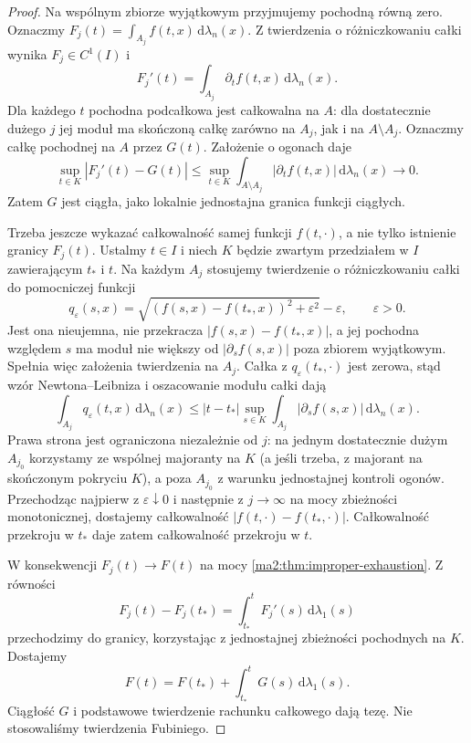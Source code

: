 \begin{proof}
Na wspólnym zbiorze wyjątkowym przyjmujemy
pochodną równą zero. Oznaczmy
$F_j(t)=\int_{A_j}f(t,x)\,\mathrm d\lambda_n(x)$.
Z twierdzenia o różniczkowaniu całki
wynika $F_j\in C^1(I)$ i
\[
 F_j'(t)=\int_{A_j}\partial_t f(t,x)\,
                         \mathrm d\lambda_n(x).
\]
Dla każdego $t$ pochodna podcałkowa jest
całkowalna na $A$: dla dostatecznie dużego
$j$ jej moduł ma skończoną całkę zarówno
na $A_j$, jak i na $A\setminus A_j$.
Oznaczmy całkę pochodnej na $A$ przez $G(t)$.
Założenie o ogonach daje
\[
 \sup_{t\in K}|F_j'(t)-G(t)|
 \le\sup_{t\in K}\int_{A\setminus A_j}
 |\partial_t f(t,x)|\,\mathrm d\lambda_n(x)
 \longrightarrow0.
\]
Zatem $G$ jest ciągła, jako lokalnie
jednostajna granica funkcji ciągłych.

Trzeba jeszcze wykazać całkowalność
samej funkcji $f(t,\cdot)$, a nie tylko
istnienie granicy $F_j(t)$.
Ustalmy $t\in I$ i niech $K$ będzie
zwartym przedziałem w $I$ zawierającym
$t_*$ i $t$. Na każdym $A_j$ stosujemy
twierdzenie o różniczkowaniu całki
do pomocniczej funkcji
\[
 q_\varepsilon(s,x)=
 \sqrt{(f(s,x)-f(t_*,x))^2+\varepsilon^2}
 -\varepsilon,\qquad \varepsilon>0.
\]
Jest ona nieujemna, nie przekracza
$|f(s,x)-f(t_*,x)|$, a jej pochodna
względem $s$ ma moduł nie większy od
$|\partial_s f(s,x)|$ poza zbiorem
wyjątkowym. Spełnia więc założenia
twierdzenia na $A_j$.
Całka z $q_\varepsilon(t_*,\cdot)$
jest zerowa, stąd wzór Newtona--Leibniza
i oszacowanie modułu całki dają
\[
 \int_{A_j}q_\varepsilon(t,x)\,
 \mathrm d\lambda_n(x)
 \le |t-t_*|\sup_{s\in K}
 \int_{A_j}|\partial_s f(s,x)|\,
                       \mathrm d\lambda_n(x).
\]
Prawa strona jest ograniczona niezależnie
od $j$: na jednym dostatecznie dużym $A_{j_0}$
korzystamy ze wspólnej majoranty na $K$
(a jeśli trzeba, z majorant na skończonym
pokryciu $K$), a poza $A_{j_0}$ z warunku
jednostajnej kontroli ogonów.
Przechodząc najpierw z $\varepsilon\downarrow0$
i następnie z $j\to\infty$ na mocy
zbieżności monotonicznej, dostajemy
całkowalność $|f(t,\cdot)-f(t_*,\cdot)|$.
Całkowalność przekroju w $t_*$
daje zatem całkowalność przekroju w $t$.

W konsekwencji $F_j(t)\to F(t)$ na mocy
\ref{ma2:thm:improper-exhaustion}.
Z równości
\[
 F_j(t)-F_j(t_*)=\int_{t_*}^t F_j'(s)\,
                               \mathrm d\lambda_1(s)
\]
przechodzimy do granicy, korzystając
z jednostajnej zbieżności pochodnych
na $K$. Dostajemy
\[
 F(t)=F(t_*)+\int_{t_*}^t G(s)\,
                               \mathrm d\lambda_1(s).
\]
Ciągłość $G$ i podstawowe twierdzenie
rachunku całkowego dają tezę.
Nie stosowaliśmy twierdzenia Fubiniego.
\end{proof}

